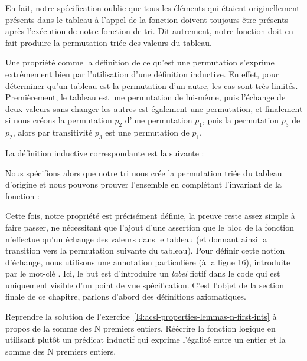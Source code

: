 En fait, notre spécification oublie que tous les éléments qui étaient
originellement présents dans le tableau à l'appel de la fonction doivent
toujours être présents après l'exécution de notre fonction de tri. Dit
autrement, notre fonction doit en fait produire la permutation triée des
valeurs du tableau.



Une propriété comme la définition de ce qu'est une permutation s'exprime
extrêmement bien par l'utilisation d'une définition inductive. En effet, pour
déterminer qu'un tableau est la permutation d'un autre, les cas sont très limités.
Premièrement, le tableau est une permutation de lui-même, puis l'échange de
deux valeurs sans changer les autres est également une permutation, et
finalement si nous créons la permutation $p_2$ d'une permutation $p_1$, puis
la permutation $p_3$ de $p_2$, alors par transitivité $p_3$ est une permutation
de $p_1$.



La définition inductive correspondante est la suivante :






Nous spécifions alors que notre tri nous crée la permutation triée du tableau
d'origine et nous pouvons prouver l'ensemble en complétant l'invariant de la
fonction :





Cette fois, notre propriété est précisément définie, la preuve reste assez
simple à faire passer, ne nécessitant que l'ajout d'une assertion que le bloc
de la fonction n'effectue qu'un échange des valeurs dans le tableau (et donnant
ainsi la transition vers la permutation suivante du tableau). Pour définir cette
notion d'échange, nous utilisons une annotation particulière (à la ligne 16),
introduite par le mot-clé . Ici, le but est d'introduire un \textit{label}
fictif dans le code qui est uniquement visible d'un point de vue spécification.
C'est l'objet de la section finale de ce chapitre, parlons d'abord des définitions
axiomatiques.








Reprendre la solution de l'exercice~\ref{l4:acsl-properties-lemmas-n-first-ints} à
propos de la somme des N premiers entiers. Réécrire la fonction logique en utilisant
plutôt un prédicat inductif qui exprime l'égalité entre un entier et la somme des
N premiers entiers.



